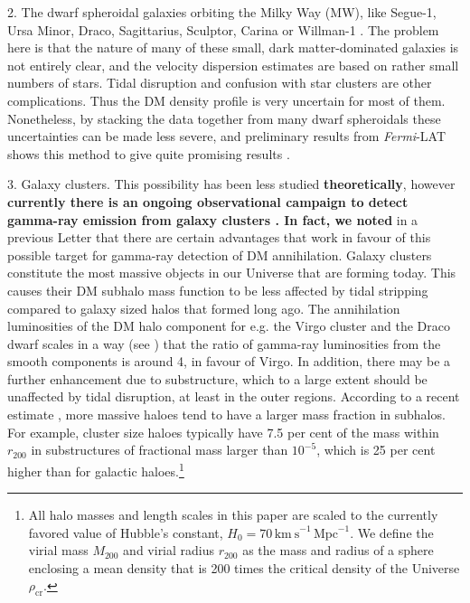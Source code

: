 \documentclass[10pt,aps,pra,reprint,amsmath,amsfonts,amssymb,showpacs,nofootinbib,floatfix]{revtex4-1}
\def\C#1{{\bf #1}}
\newcommand{\Fermi}{{\em Fermi}\xspace}
\newcommand{\rmn}{\mathrm}
\newcommand{\rvir}{r_{200}}
\newcommand{\mvir}{M_{200}}
\begin{document}
2. The dwarf spheroidal galaxies orbiting the Milky Way (MW), like
Segue-1, Ursa Minor, Draco, Sagittarius, Sculptor, Carina or Willman-1
\cite{2009JCAP...01..016B,2010ApJ...720.1174A,2010JCAP...01..031S,2010JCAP...01..031S,2011arXiv1103.0477T,2011APh....34..608H}. The
problem here is that the nature of many of these small, dark
matter-dominated galaxies is not entirely clear, and the velocity
dispersion estimates are based on rather small numbers of stars. Tidal
disruption and confusion with star clusters are other
complications. Thus the DM density profile is very uncertain for most
of them. Nonetheless, by stacking the data together from many dwarf
spheroidals these uncertainties can be made less severe, and
preliminary results from \Fermi-LAT shows this method to give quite
promising results \cite{garde}.

3. Galaxy clusters. This possibility has been less studied \C{theoretically}, however
\C{currently there is an ongoing observational campaign to detect
  gamma-ray emission from galaxy clusters
  \cite{2010ApJ...710..634A,2010JCAP...05..025A,2009A&A...495...27A,2009IJMPD..18.1627D,2009A&A...502..437A,2009arXiv0907.5000G,2009ApJ...704..240K,2009ApJ...706L.275A,2010ApJ...717L..71A}. In fact, we noted} in a previous Letter
\cite{2009PhRvL.103r1302P} that there are certain advantages that work
in favour of this possible target for gamma-ray detection of DM
annihilation. Galaxy clusters constitute the most massive objects in
our Universe that are forming today. This causes their DM subhalo mass
function to be less affected by tidal stripping compared to galaxy
sized halos that formed long ago.  The annihilation luminosities of
the DM halo component for e.g. the Virgo cluster and the Draco dwarf
scales in a way (see \cite{2009PhRvL.103r1302P}) that the ratio of
gamma-ray luminosities from the smooth components is around 4, in
favour of Virgo. In addition, there may be a further enhancement due
to substructure, which to a large extent should be unaffected by tidal
disruption, at least in the outer regions.  According to a recent
estimate \cite{2011MNRAS.410.2309G}, more massive haloes tend to have
a larger mass fraction in subhalos.  For example, cluster size haloes
typically have 7.5 per cent of the mass within $r_{200}$ in
substructures of fractional mass larger than $10^{-5}$, which is 25
per cent higher than for galactic haloes.\footnote{All halo masses and
  length scales in this paper are scaled to the currently favored
  value of Hubble's constant, $H_0 = 70\,
  \rmn{km~s}^{-1}\,\rmn{Mpc}^{-1}$. We define the virial mass $\mvir$
  and virial radius $\rvir$ as the mass and radius of a sphere
  enclosing a mean density that is 200 times the critical density of
  the Universe $\rho_{\rmn{cr}}$.}
\end{document}
